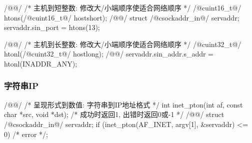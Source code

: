 \documentclass[hidelinks]{ctexart}
\begin{document}
\begin{clst}
/@@/
/* 主机到短整数: 修改大/小端顺序使适合网络顺序 */
/@\+c{uint16\_t}@/ htons(/@\+c{uint16\_t}@/ hostshort);
/@\lhend @/
struct /@\+c{sockaddr\_in}@/ servaddr;
servaddr.sin_port = htons(13);
\end{clst}

\begin{clst}
/@@/
/* 主机到长整数: 修改大/小端顺序使适合网络顺序 */
/@\+c{uint32\_t}@/ htonl(/@\+c{uint32\_t}@/ hostlong);
/@\lhend @/
servaddr.sin_addr.s_addr = htonl(INADDR_ANY);
\end{clst}


\subsubsection{字符串IP} %
\label{ssub:字符串ip}

\begin{clst}
/@@/
/* 呈现形式到数值: 字符串到IP地址格式 */
int inet_pton(int af, const char *src, void *dst);
/* 成功时返回1, 出错时返回0或-1 */
/@\lhend @/
struct /@\+c{sockaddr\_in}@/ servaddr;
if (inet_pton(AF_INET, argv[1], &servaddr) <= 0) /* error */;
\end{clst}



\end{document}
